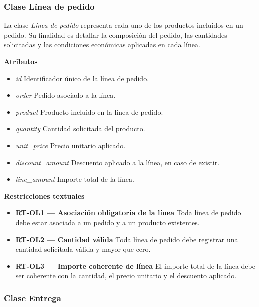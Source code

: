 \subsubsection{Clase Línea de pedido}

La clase \textit{Línea de pedido} representa cada uno de los productos incluidos en un pedido. Su finalidad es detallar la composición del pedido, las cantidades solicitadas y las condiciones económicas aplicadas en cada línea.

\textbf{Atributos}

\begin{itemize}
      \item \textit{id}
            Identificador único de la línea de pedido.
      \item \textit{order}
            Pedido asociado a la línea.
      \item \textit{product}
            Producto incluido en la línea de pedido.
      \item \textit{quantity}
            Cantidad solicitada del producto.
      \item \textit{unit\_price}
            Precio unitario aplicado.
      \item \textit{discount\_amount}
            Descuento aplicado a la línea, en caso de existir.
      \item \textit{line\_amount}
            Importe total de la línea.
\end{itemize}

\textbf{Restricciones textuales}

\begin{itemize}
      \item \textbf{RT-OL1 — Asociación obligatoria de la línea}
            Toda línea de pedido debe estar asociada a un pedido y a un producto existentes.
      \item \textbf{RT-OL2 — Cantidad válida}
            Toda línea de pedido debe registrar una cantidad solicitada válida y mayor que cero.
      \item \textbf{RT-OL3 — Importe coherente de línea}
            El importe total de la línea debe ser coherente con la cantidad, el precio unitario y el descuento aplicado.
\end{itemize}

\subsubsection{Clase Entrega}

